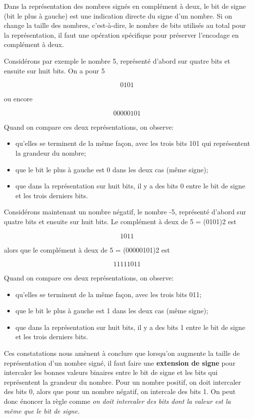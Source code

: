\documentclass[letter, oneside]{book}
\begin{document}
\begin{enumerate}
Dans la représentation des nombres signés en complément à deux, le bit
de signe (bit le plus à gauche) est une indication directe du signe
d'un nombre. Si on change la taille des nombres, c'est-à-dire, le nombre
de bits utilisés au total pour la représentation, il faut une
opération spécifique pour préserver l'encodage en complément à deux. 

Considérons par exemple le nombre 5, représenté d'abord sur quatre
bits et ensuite sur huit bits. On a pour 5 

$$0101$$

ou encore 

$$00000101$$

Quand on compare ces deux représentations, on observe: 

\begin{itemize}
\item qu'elles se terminent de la même façon, avec les trois bits 101 qui
représentent la grandeur du nombre;
\item que le bit le plus à gauche est 0 dans les deux cas (même signe);
\item que dans la représentation sur huit bits, il y a des bits 0 entre le bit
de signe et les trois derniers bits.
\end{itemize}

Considérons maintenant un nombre négatif, le nombre -5, représenté
d'abord sur quatre bits et ensuite sur huit bits. Le complément à deux
de 5 = (0101)2 est

$$1011$$

alors que le complément à deux de 5 = (00000101)2 est

$$11111011$$

Quand on compare ces deux représentations, on observe: 

\begin{itemize}
\item qu'elles se terminent de la même façon, avec les trois bits 011;
\item que le bit le plus à gauche est 1 dans les deux cas (même signe);
\item que dans la représentation sur huit bits, il y a des bits 1 entre le bit
de signe et les trois derniers bits.
\end{itemize}

Ces constatations nous amènent à conclure que lorsqu'on augmente la
taille de représentation d'un nombre signé, il faut faire une
\textbf{extension de signe} pour intercaler les bonnes valeurs binaires entre
le bit de signe et les bits qui représentent la grandeur du
nombre. Pour un nombre positif, on doit intercaler des bits 0, alors
que pour un nombre négatif, on intercale des bits 1. On peut donc
énoncer la règle comme \emph{on doit intercaler des bits dont la valeur est
la même que le bit de signe.}


\end{enumerate}
\end{document}
